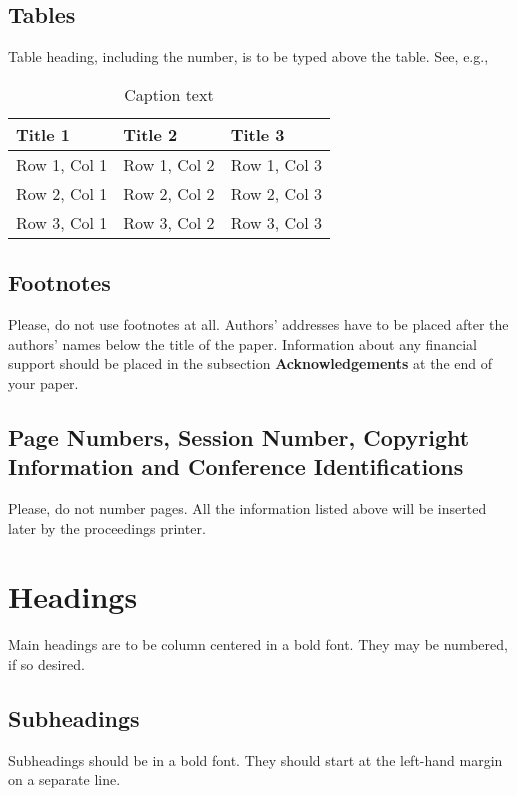 \documentclass{physcon}
\begin{document}
\subsection{Tables}
Table heading, including the number, is to be typed
above the table. See, e.g., 
\begin{table}[htb]
\begin{center}
\caption{Caption text}
\begin{tabular}{lll}
\hline
Title 1 & Title 2 & Title 3\\
\hline
Row 1, Col 1 & Row 1, Col 2 & Row 1, Col 3\\
Row 2, Col 1 & Row 2, Col 2 & Row 2, Col 3\\
Row 3, Col 1 & Row 3, Col 2 & Row 3, Col 3\\
\hline
\end{tabular}
\end{center}
\end{table}

\subsection{Footnotes}
Please, do not use footnotes at all. 
Authors' addresses have to be
placed after the authors' names below the title of the paper. 
Information about any financial support should be placed 
in the subsection {\bf Acknowledgements} at the end of your paper. 

\subsection{Page Numbers, Session Number, 
Copyright Information and Conference Identifications}

Please, do not number pages. All the information listed above
will be inserted later by the proceedings printer.

\section{Headings}

Main headings are to be column centered in a bold font. 
They may be numbered, if so desired. 

\subsection{Subheadings}
Subheadings should be in a bold font. They should start at 
the left-hand margin on a separate line. 
\end{document}
